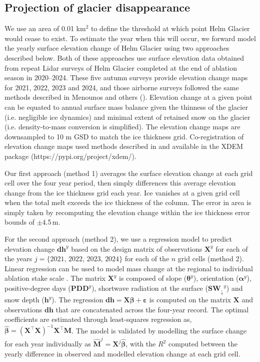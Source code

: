 \documentclass[annals,review,oneside]{igs}
\begin{document}
\subsection{Projection of glacier disappearance}

We use an area of 0.01 km$^{2}$ to define the threshold at which point Helm Glacier would cease to exist. To estimate the year when this will occur, we forward model the yearly surface elevation change of Helm Glacier using two approaches described below. Both of these approaches use surface elevation data obtained from repeat Lidar surveys of Helm Glacier completed at the end of ablation season in 2020--2024. These five autumn surveys provide elevation change maps for 2021, 2022, 2023 and 2024, and those airborne surveys followed the same methods described in Menounos and others (\citeyear{Menounos2025}). Elevation change at a given point can be equated to annual surface mass balance given the thinness of the glacier (i.e. negligible ice dynamics) and minimal extent of retained snow on the glacier (i.e. density-to-mass conversion is simplified). The elevation change maps are downsampled to 10 m GSD to match the ice thickness grid. Co-registration of elevation change maps used methods described in \cite{Nuth2011} and \cite{Hugonnet2022} available in the XDEM package (https://pypi.org/project/xdem/).

Our first approach (method 1) averages the surface elevation change at each grid cell over the four year period, then simply differences this average elevation change from the ice thickness grid each year. Ice vanishes at a given grid cell when the total melt exceeds the ice thickness of the column. The error in area is simply taken by recomputing the elevation change within the ice thickness error bounds of $\pm$4.5\,m. 

For the second approach (method 2), we use a regression model to predict elevation change $\mathbf{dh}^{y}$ based on the design matrix of observations $\mathbf{X}^{y}$ for each of the years $j=\{2021,\,2022,\,2023,\,2024\}$ for each of the $n$ grid cells (method 2). Linear regression can be used to model mass change at the regional \citep{Lliboutry1974,Anilkumar2023,Reynaud1986} to individual ablation stake scale \citep{Zekollari2018}. The matrix $\mathbf{X}^{y}$ is composed of slope ($\boldsymbol{\theta}^{y}$), orientation ($\boldsymbol{\alpha}^{y}$), positive-degree days ($\mathbf{PDD}^{y}$), shortwave radiation at the surface ($\mathbf{SW_{\downarrow}}^{y}$) and snow depth ($\mathbf{h}^{y}$). The regression $\mathbf{dh} = \mathbf{X} \boldsymbol{\beta} + \boldsymbol{\varepsilon}$ is computed on the matrix $\mathbf{X}$ and observations $\mathbf{dh}$ that are concatenated across the four-year record. The optimal coefficients are estimated through least-squares regression as, $\hat{\boldsymbol{\beta}} = (\mathbf{X}^\top \mathbf{X})^{-1} \mathbf{X}^\top \mathbf{M}$. The model is validated by modelling the surface change for each year individually as $\hat{\mathbf{M}}^{j} = \mathbf{X}^{j} \hat{\boldsymbol{\beta}}$, with the $R^2$ computed between the yearly difference in observed and modelled elevation change at each grid cell. 
\end{document}
